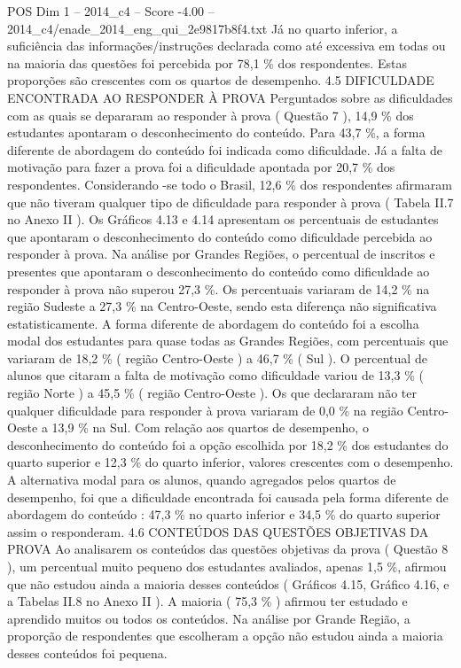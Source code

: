 \begin{textsample}{POS Dim 1 – 2014\_c4 – Score -4.00 – 2014\_c4/enade\_2014\_eng\_qui\_2e9817b8f4.txt}
Já no quarto inferior, a suficiência das informações/instruções declarada como até excessiva em todas ou na maioria das questões foi percebida por 78,1 \% dos respondentes.
Estas proporções são crescentes com os quartos de desempenho. 4.5 DIFICULDADE ENCONTRADA AO RESPONDER À PROVA Perguntados sobre as dificuldades com as quais se depararam ao responder à prova ( Questão 7 ), 14,9 \% dos estudantes apontaram o desconhecimento do conteúdo.
Para 43,7 \%, a forma diferente de abordagem do conteúdo foi indicada como dificuldade.
Já a falta de motivação para fazer a prova foi a dificuldade apontada por 20,7 \% dos respondentes.
Considerando -se todo o Brasil, 12,6 \% dos respondentes afirmaram que não tiveram qualquer tipo de dificuldade para responder à prova ( Tabela II.7 no Anexo II ).
Os Gráficos 4.13 e 4.14 apresentam os percentuais de estudantes que apontaram o desconhecimento do conteúdo como dificuldade percebida ao responder à prova.
Na análise por Grandes Regiões, o percentual de inscritos e presentes que apontaram o desconhecimento do conteúdo como dificuldade ao responder à prova não superou 27,3 \%.
Os percentuais variaram de 14,2 \% na região Sudeste a 27,3 \% na Centro-Oeste, sendo esta diferença não significativa estatisticamente.
A forma diferente de abordagem do conteúdo foi a escolha modal dos estudantes para quase todas as Grandes Regiões, com percentuais que variaram de 18,2 \% ( região Centro-Oeste ) a 46,7 \% ( Sul ).
O percentual de alunos que citaram a falta de motivação como dificuldade variou de 13,3 \% ( região Norte ) a 45,5 \% ( região Centro-Oeste ).
Os que declararam não ter qualquer dificuldade para responder à prova variaram de 0,0 \% na região Centro-Oeste a 13,9 \% na Sul.
Com relação aos quartos de desempenho, o desconhecimento do conteúdo foi a opção escolhida por 18,2 \% dos estudantes do quarto superior e 12,3 \% do quarto inferior, valores crescentes com o desempenho.
A alternativa modal para os alunos, quando agregados pelos quartos de desempenho, foi que a dificuldade encontrada foi causada pela forma diferente de abordagem do conteúdo : 47,3 \% no quarto inferior e 34,5 \% do quarto superior assim o responderam. 4.6 CONTEÚDOS DAS QUESTÕES OBJETIVAS DA PROVA Ao analisarem os conteúdos das questões objetivas da prova ( Questão 8 ), um percentual muito pequeno dos estudantes avaliados, apenas 1,5 \%, afirmou que não estudou ainda a maioria desses conteúdos ( Gráficos 4.15, Gráfico 4.16, e a Tabelas II.8 no Anexo II ).
A maioria ( 75,3 \% ) afirmou ter estudado e aprendido muitos ou todos os conteúdos.
Na análise por Grande Região, a proporção de respondentes que escolheram a opção não estudou ainda a maioria desses conteúdos foi pequena.

\end{textsample}
